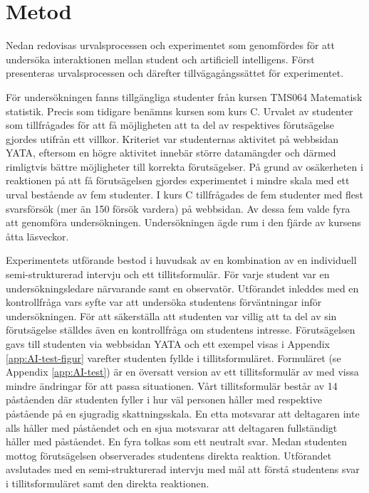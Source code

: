 \section{Metod}
Nedan redovisas urvalsprocessen och experimentet som genomfördes för att undersöka interaktionen mellan student och artificiell intelligens. Först presenteras urvalsprocessen och därefter tillvägagångssättet för experimentet.

För undersökningen fanns tillgängliga studenter från kursen TMS064 Matematisk statistik. Precis som tidigare benämns kursen som kurs C. Urvalet av studenter som tillfrågades för att få möjligheten att ta del av respektives förutsägelse gjordes utifrån ett villkor. Kriteriet var studenternas aktivitet på webbsidan YATA, eftersom en högre aktivitet innebär större datamängder och därmed rimligtvis bättre möjligheter till korrekta förutsägelser. På grund av osäkerheten i reaktionen på att få förutsägelsen gjordes experimentet i mindre skala med ett urval bestående av fem studenter. I kurs C tillfrågades de fem studenter med flest svarsförsök (mer än 150 försök vardera) på webbsidan. Av dessa fem valde fyra att genomföra undersökningen. Undersökningen ägde rum i den fjärde av kursens åtta läsveckor.

Experimentets utförande bestod i huvudsak av en kombination av en individuell semi-strukturerad intervju och ett tillitsformulär. För varje student var en undersökningsledare närvarande samt en observatör. Utförandet inleddes med en kontrollfråga vars syfte var att undersöka studentens förväntningar inför undersökningen. För att säkerställa att studenten var villig att ta del av sin förutsägelse ställdes även en kontrollfråga om studentens intresse. Förutsägelsen gavs till studenten via webbsidan YATA och ett exempel visas i Appendix \ref{app:AI-test-figur} varefter studenten fyllde i tillitsformuläret. Formuläret (se Appendix \ref{app:AI-test}) är en översatt version av ett tillitsformulär av \cite{trust} med vissa mindre ändringar för att passa situationen. Vårt tillitsformulär består av 14 påståenden där studenten fyller i hur väl personen håller med respektive påstående på en sjugradig skattningsskala. En etta motsvarar att deltagaren inte alls håller med påståendet och en sjua motsvarar att deltagaren fullständigt håller med påståendet. En fyra tolkas som ett neutralt svar. Medan studenten mottog förutsägelsen observerades studentens direkta reaktion. Utförandet avslutades med en semi-strukturerad intervju med mål att förstå studentens svar i tillitsformuläret samt den direkta reaktionen.

